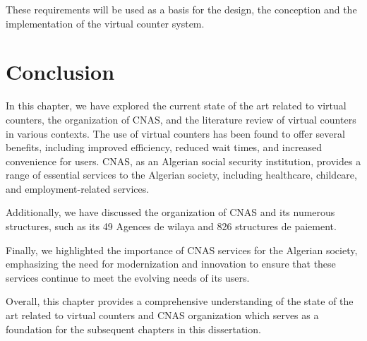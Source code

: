 These requirements will be used as a basis for the design, the conception and the implementation of the virtual counter system.

\section{Conclusion}
In this chapter, we have explored the current state of the art related to virtual counters, the organization of CNAS, and the literature review of virtual counters in various contexts. The use of virtual counters has been found to offer several benefits, including improved efficiency, reduced wait times, and increased convenience for users. CNAS, as an Algerian social security institution, provides a range of essential services to the Algerian society, including healthcare, childcare, and employment-related services.

Additionally, we have discussed the organization of CNAS and its numerous structures, such as its 49 Agences de wilaya and 826 structures de paiement. 
\medskip

Finally, we highlighted the importance of CNAS services for the Algerian society, emphasizing the need for modernization and innovation to ensure that these services continue to meet the evolving needs of its users.

Overall, this chapter provides a comprehensive understanding of the state of the art related to virtual counters and CNAS organization which serves as a foundation for the subsequent chapters in this dissertation.

